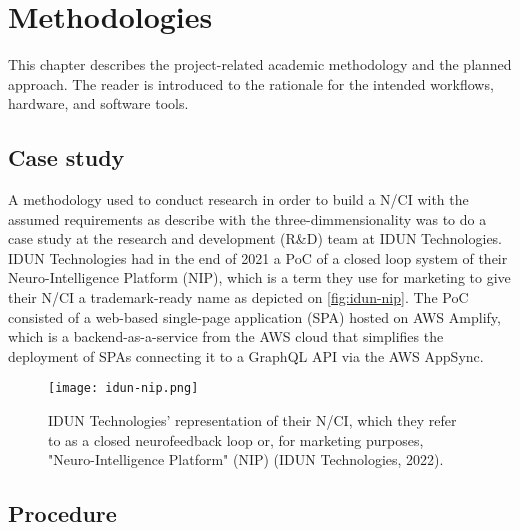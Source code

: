 \chapter{Methodologies}
\graphicspath{{Chapter3/Figs/}{Chapter3/Figs/}}

This chapter describes the project-related academic methodology and the planned approach. The reader is introduced to the rationale for the intended workflows, hardware, and software tools.

\section{Case study}
\label{chapter3-case-study}

A methodology used to conduct research in order to build a N/CI with the assumed requirements as describe with the three-dimmensionality was to do a case study at the research and development (R\&D) team at IDUN Technologies. IDUN Technologies had in the end of 2021 a PoC of a closed loop system of their Neuro-Intelligence Platform (NIP), which is a term they use for marketing to give their N/CI a trademark-ready name as depicted on \autoref{fig:idun-nip}. The PoC consisted of a web-based single-page application (SPA) hosted on AWS Amplify, which is a backend-as-a-service from the AWS cloud that simplifies the deployment of SPAs connecting it to a GraphQL API via the AWS AppSync.

\begin{figure}[!ht]
  \centering
  \texttt{[image: idun-nip.png]}
  \caption{IDUN Technologies' representation of their N/CI, which they refer to as a closed neurofeedback loop or, for marketing purposes, "Neuro-Intelligence Platform" (NIP) (IDUN Technologies, 2022).}
  \label{fig:idun-nip}
\end{figure}


\section{Procedure}
\label{procedure}


